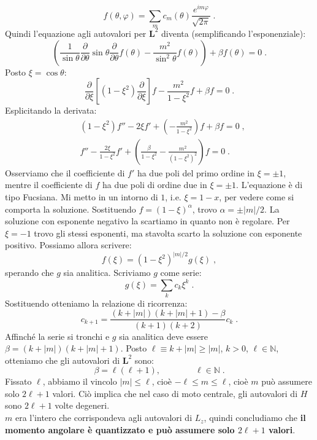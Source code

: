 \documentclass[12pt,a4paper]{report}
\theoremstyle{definition}
\numberwithin{equation}{section}
\begin{document}
\begin{equation}
f(\theta,\varphi)=\sum_m c_m(\theta)\frac{e^{im\varphi}}{\sqrt{2\pi}}\;.
\end{equation}
Quindi l'equazione agli autovalori per $\mathbf{L}^2$ diventa (semplificando l'esponenziale):
\begin{equation}
\left(\frac{1}{\sin\theta}\frac{\partial}{\partial\theta}\sin\theta\frac{\partial}{\partial\theta}f(\theta)-\frac{m^2}{\sin^2\theta}f(\theta)\right)+\beta f(\theta)=0\;.
\end{equation}
Posto $\xi=\cos\theta$:
\begin{equation}
\frac{\partial}{\partial\xi}\left[(1-\xi^2)\frac{\partial}{\partial\xi}\right]f-\frac{m^2}{1-\xi^2}f+\beta f=0\;.
\end{equation}
Esplicitando la derivata:
\begin{align*}
&(1-\xi^2)f''-2\xi f'+\left(-\frac{m^2}{1-\xi^2}\right)f+\beta f=0\;, \\
&f''-\frac{2\xi}{1-\xi^2}f'+\left(\frac{\beta}{1-\xi^2}-\frac{m^2}{(1-\xi^2)^2}\right)f=0\;.
\end{align*}
Osserviamo che il coefficiente di $f'$ ha due poli del primo ordine in $\xi=\pm 1$, mentre il coefficiente di $f$ ha due poli di ordine due in $\xi=\pm 1$. L'equazione è di tipo Fucsiana. Mi metto in un intorno di $1$, i.e. $\xi=1-x$, per vedere come si comporta la soluzione. Sostituendo $f=(1-\xi)^{\alpha}$, trovo $\alpha=\pm |m|/2$. La soluzione con esponente  negativo la scartiamo in quanto non è regolare. Per $\xi=-1$ trovo gli stessi esponenti, ma stavolta scarto la soluzione con esponente positivo. Possiamo allora scrivere:
\begin{equation}
f(\xi)=(1-\xi^2)^{|m|/2}g(\xi)\;,
\end{equation}
sperando che $g$ sia analitica. Scriviamo $g$ come serie:
\begin{equation}
g(\xi)=\sum_k c_k \xi^k\;.
\end{equation}
Sostituendo otteniamo la relazione di ricorrenza:
\begin{equation}
c_{k+1}=\frac{(k+|m|)(k+|m|+1)-\beta}{(k+1)(k+2)}c_k\;.
\end{equation}
Affinché la serie si tronchi e $g$ sia analitica deve essere $\beta=(k+|m|)(k+|m|+1)$. Posto $\ell\equiv k+|m|\ge |m|$, $k>0$, $\ell\in\mathbb{N}$, otteniamo che gli autovalori di $\mathbf{L}^2$ sono:
\begin{equation}
\beta=\ell(\ell+1),\qquad \qquad \ell\in\mathbb{N}\;.
\end{equation}
Fissato $\ell$, abbiamo il vincolo $|m|\le \ell$, cioè $-\ell\le m\le \ell$, cioè $m$ può assumere solo $2\ell+1$ valori. Ciò implica che nel caso di moto centrale, gli autovalori di $H$ sono $2\ell+1$ volte degeneri. \\
$m$ era l'intero che corrispondeva agli autovalori di $L_z$, quindi concludiamo che \textbf{il momento angolare è quantizzato e può assumere solo $2\ell+1$ valori}.
\end{document}
